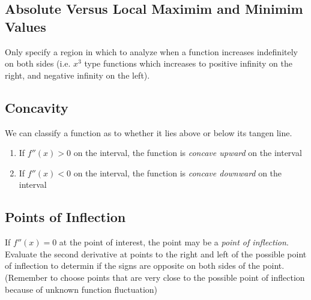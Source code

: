 \documentclass[a4paper,11pt]{book}
\begin{document}
\subsection{Absolute Versus Local Maximim and Minimim Values}
Only specify a region in which to analyze when a function increases indefinitely on both sides (i.e. $ x^3 $ type functions which increases to positive infinity on the right, and negative infinity on the left).

\subsection{Concavity}
We can classify a function as to whether it lies above or below its tangen line.
\begin{enumerate}
  \item If $ f''(x) > 0 $ on the interval, the function is \textit{concave upward} on the interval
  \item If $ f''(x) < 0 $ on the interval, the function is \textit{concave downward} on the interval
\end{enumerate}

\subsection{Points of Inflection}
If $ f''(x) = 0 $ at the point of interest, the point may be a \textit{point of inflection}. Evaluate the second derivative at points to the right and left of the possible point of inflection to determin if the signs are opposite on both sides of the point. (Remember to choose points that are very close to the possible point of inflection because of unknown function fluctuation)
\end{document}
